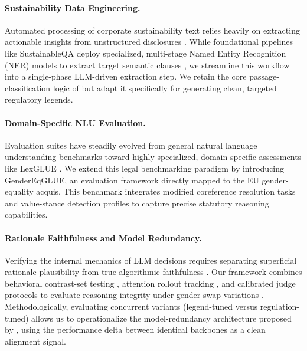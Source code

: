 \documentclass[pdflatex,sn-mathphys-num]{sn-jnl}%
\theoremstyle{thmstyleone}%
\theoremstyle{thmstyletwo}%
\theoremstyle{thmstylethree}%
\begin{document}
\paragraph{Sustainability Data Engineering.} Automated processing of corporate
sustainability text relies heavily on extracting actionable insights from
unstructured disclosures \citep{paruchuri2024marker, lan2025sustainableqa}.
While foundational pipelines like SustainableQA deploy specialized, multi-stage
Named Entity Recognition (NER) models to extract target semantic clauses
\citep{vutukuri2023esg, exponentialscience2023esg}, we streamline this workflow
into a single-phase LLM-driven extraction step. We retain the core
passage-classification logic of \citet{lan2025sustainableqa} but adapt it
specifically for generating clean, targeted regulatory legends.

\paragraph{Domain-Specific NLU Evaluation.} Evaluation suites have steadily
evolved from general natural language understanding benchmarks
\citep{wang2018glue} toward highly specialized, domain-specific assessments like
LexGLUE \citep{chalkidis2022lexglue}. We extend this legal benchmarking paradigm
by introducing GenderEqGLUE, an evaluation framework directly mapped to the EU
gender-equality acquis. This benchmark integrates modified coreference
resolution tasks \citep{zhao2018winobias} and value-stance detection profiles to
capture precise statutory reasoning capabilities.

\paragraph{Rationale Faithfulness and Model Redundancy.} Verifying the internal
mechanics of LLM decisions requires separating superficial rationale
plausibility from true algorithmic faithfulness \citep{turpin2023language,
lanham2023measuring, deyoung2020eraser}. Our framework combines behavioral
contrast-set testing \citep{ribeiro2020beyond, gardner2020evaluating}, attention
rollout tracking \citep{abnar2020quantifying}, and calibrated judge protocols
\citep{zheng2023judging} to evaluate reasoning integrity under gender-swap
variations \citep{lacombe2024gecobench}. Methodologically, evaluating concurrent
variants (legend-tuned versus regulation-tuned) allows us to operationalize the
model-redundancy architecture proposed by \citet{sargsyan2025compliance}, using
the performance delta between identical backbones as a clean alignment signal.
\end{document}

